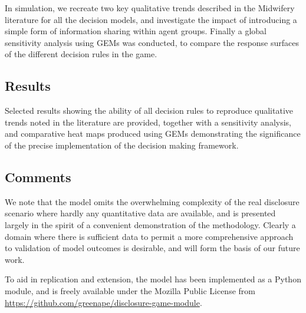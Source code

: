 In simulation, we recreate two key qualitative trends described in the Midwifery literature for all the decision models, and investigate the impact of introducing a simple form of information sharing within agent groups.
Finally a global sensitivity analysis using \acp{GEM} was conducted, to compare the response surfaces of the different decision rules in the game.

\subsection*{Results} 

Selected results showing the ability of all decision rules to reproduce qualitative trends noted in the literature are provided, together with a sensitivity analysis, and comparative heat maps produced using \acp{GEM} demonstrating the significance of the precise implementation of the decision making framework.

\subsection*{Comments} 


We note that the model omits the overwhelming complexity of the real disclosure scenario where hardly any quantitative data are available, and is presented largely in the spirit of a convenient demonstration of the methodology. Clearly a domain where there is sufficient data to permit a more comprehensive approach to validation of model outcomes is desirable, and will form the basis of our future work.

To aid in replication and extension, the model has been implemented as a Python module, and is freely available under the Mozilla Public License from \url{https://github.com/greenape/disclosure-game-module}.